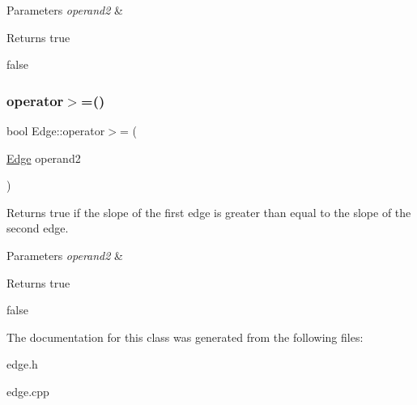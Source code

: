 \begin{DoxyParams}{Parameters}
{\em operand2} & \\
\hline
\end{DoxyParams}
\begin{DoxyReturn}{Returns}
true 

false 
\end{DoxyReturn}
\mbox{\label{classEdge_a7b6040b38d6e8ff509f226b1d873d7f7}} 
\subsubsection{\texorpdfstring{operator$>$=()}{operator>=()}}
{\footnotesize\ttfamily bool Edge\+::operator$>$= (\begin{DoxyParamCaption}\item[{\hyperlink{classEdge}{Edge}}]{operand2 }\end{DoxyParamCaption})}



Returns true if the slope of the first edge is greater than equal to the slope of the second edge. 


\begin{DoxyParams}{Parameters}
{\em operand2} & \\
\hline
\end{DoxyParams}
\begin{DoxyReturn}{Returns}
true 

false 
\end{DoxyReturn}


The documentation for this class was generated from the following files\+:\begin{DoxyCompactItemize}
\item 
edge.\+h\item 
edge.\+cpp\end{DoxyCompactItemize}

